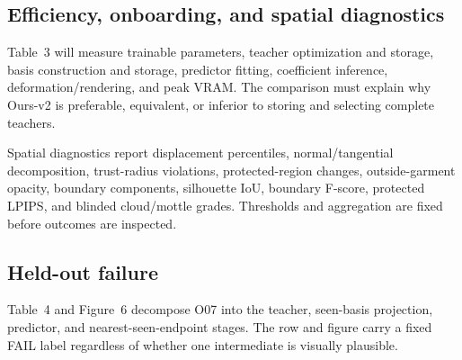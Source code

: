 \subsection{Efficiency, onboarding, and spatial diagnostics}

Table~3 will measure trainable parameters, teacher optimization and storage, basis construction and storage, predictor fitting, coefficient inference, deformation/rendering, and peak VRAM. The comparison must explain why Ours-v2 is preferable, equivalent, or inferior to storing and selecting complete teachers.

Spatial diagnostics report displacement percentiles, normal/tangential decomposition, trust-radius violations, protected-region changes, outside-garment opacity, boundary components, silhouette IoU, boundary F-score, protected LPIPS, and blinded cloud/mottle grades. Thresholds and aggregation are fixed before outcomes are inspected.

\subsection{Held-out failure}

Table~4 and Figure~6 decompose O07 into the teacher, seen-basis projection, predictor, and nearest-seen-endpoint stages. The row and figure carry a fixed FAIL label regardless of whether one intermediate is visually plausible.

